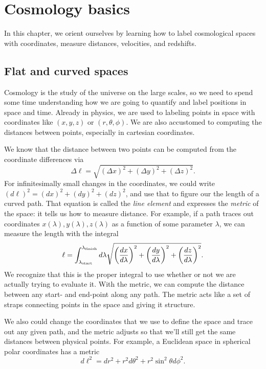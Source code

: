 \chapter{Cosmology basics} \label{ch:basics}

In this chapter, we orient ourselves by learning how to label cosmological spaces with coordinates, measure distances, velocities, and redshifts.

\section{Flat and curved spaces}
Cosmology is the study of the universe on the large scales, so we need to spend some time understanding how we are going to quantify and label positions in space and time.  Already in physics, we are used to labeling points in space with coordinates like $(x,y,z)$ or $(r,\theta,\phi)$.  We are also accustomed to computing the distances between points, especially in cartesian coordinates.

We know that the distance between two points can be computed from the coordinate differences via
\begin{equation}
  \Delta \ell = \sqrt{(\Delta x)^2 + (\Delta y)^2 + (\Delta z)^2 }.
\end{equation}
For infinitesimally small changes in the coordinates, we could write $  (d\ell)^2 = (dx)^2 + (dy)^2 + (dz)^2$, and use that to figure our the length of a curved path.  That equation is called the \textit{line element} and expresses the \textit{metric} of the space: it tells us how to measure distance.  For example, if a path traces out coordinates $x(\lambda),y(\lambda),z(\lambda)$ as a function of some parameter $\lambda$, we can measure the length with the integral
\begin{equation}
   \ell = \int_{\lambda_{\rm start}}^{\lambda_{\rm finish}} d\lambda \sqrt{ \left(\frac{dx}{d\lambda} \right)^2 + \left(\frac{dy}{d\lambda}\right)^2 + \left(\frac{dz}{d\lambda}\right)^2}.
\end{equation}
We recognize that this is the proper integral to use whether or not we are actually trying to evaluate it.  With the metric, we can compute the distance between any start- and end-point along any path.  The metric acts like a set of straps connecting points in the space and giving it structure.

We also could change the coordinates that we use to define the space and trace out any given path, and the metric adjusts so that we'll still get the same distances between physical points.  For example, a Euclidean space in spherical polar coordinates has a metric
\begin{equation}
   d\ell^2 = dr^2 + r^2 d\theta^2 + r^2 \sin^2 \theta d\phi^2.
\end{equation}

